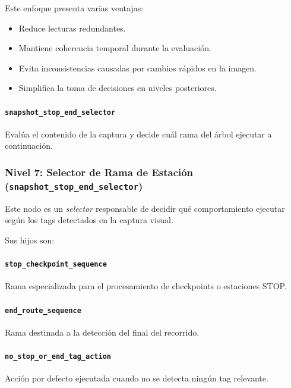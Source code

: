 \documentclass{prgrado}
\begin{document}
Este enfoque presenta varias ventajas:

\begin{itemize}
    \item Reduce lecturas redundantes.
    \item Mantiene coherencia temporal durante la evaluación.
    \item Evita inconsistencias causadas por cambios rápidos en la imagen.
    \item Simplifica la toma de decisiones en niveles posteriores.
\end{itemize}

\paragraph{\texttt{snapshot\_stop\_end\_selector}}

Evalúa el contenido de la captura y decide cuál rama del árbol ejecutar a continuación.

\subsubsection{Nivel 7: Selector de Rama de Estación (\texttt{snapshot\_stop\_end\_selector})}

Este nodo es un \textit{selector} responsable de decidir qué comportamiento ejecutar según los tags detectados en la captura visual.

Sus hijos son:

\paragraph{\texttt{stop\_checkpoint\_sequence}}

Rama especializada para el procesamiento de checkpoints o estaciones STOP.

\paragraph{\texttt{end\_route\_sequence}}

Rama destinada a la detección del final del recorrido.

\paragraph{\texttt{no\_stop\_or\_end\_tag\_action}}

Acción por defecto ejecutada cuando no se detecta ningún tag relevante.
\end{document}

